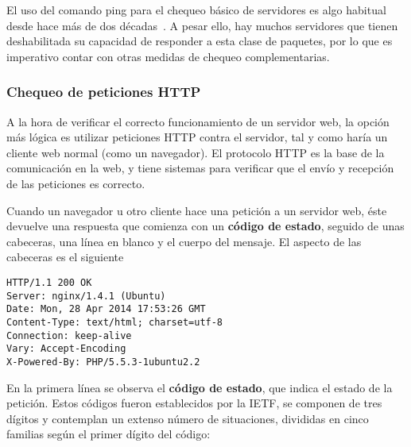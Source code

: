 El uso del comando ping para el chequeo básico de servidores es algo habitual
desde hace más de dos décadas~\cite{salus1994a}. A pesar ello, hay muchos
servidores que tienen deshabilitada su capacidad de responder a esta clase de
paquetes, por lo que es imperativo contar con otras medidas de chequeo
complementarias.

\subsubsection{Chequeo de peticiones HTTP}

A la hora de verificar el correcto funcionamiento de un servidor web, la opción
más lógica es utilizar peticiones \ac{HTTP} contra el servidor, tal y como haría
un cliente web normal (como un navegador). El protocolo HTTP es la base de la
comunicación en la web, y tiene sistemas para verificar que el envío y recepción
de las peticiones es correcto.

Cuando un navegador u otro cliente hace una petición a un servidor web, éste
devuelve una respuesta que comienza con un \textbf{código de
  estado}, seguido de unas cabeceras, una línea en blanco y el cuerpo del
mensaje. El aspecto de las cabeceras es el siguiente

\begin{verbatim}
HTTP/1.1 200 OK
Server: nginx/1.4.1 (Ubuntu)
Date: Mon, 28 Apr 2014 17:53:26 GMT
Content-Type: text/html; charset=utf-8
Connection: keep-alive
Vary: Accept-Encoding
X-Powered-By: PHP/5.5.3-1ubuntu2.2
\end{verbatim}

En la primera línea se observa el \textbf{código de estado}, que indica el
estado de la petición. Estos códigos fueron establecidos por la \ac{IETF}, se
componen de tres dígitos y contemplan un extenso número de situaciones,
divididas en cinco familias según el primer dígito del código:

